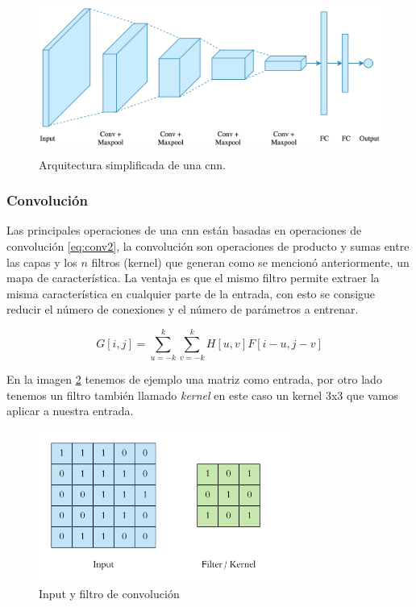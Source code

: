\begin{figure}[H]
 \centering
  \includegraphics[height=5cm,keepaspectratio=true,clip=true]{imagenes/MarcoTeorico/cnn_intuition.png}
  \caption{Arquitectura simplificada de una \ac{cnn}.} \label{Fig:cnn_network}
\end{figure}






\subsubsection{Convolución}\label{sub:convolucion}
Las principales operaciones de una \ac{cnn} están basadas en operaciones de convolución \ref{eq:conv2}, la convolución son operaciones de producto y sumas entre las capas y los $n $ filtros (kernel) que generan como se mencionó anteriormente, un mapa de característica. La ventaja es que el mismo filtro permite extraer la misma característica en cualquier parte de la entrada, con esto se consigue reducir el número de conexiones y el número de parámetros a entrenar.

\begin{equation}\label{eq:conv2}
    G[i, j] = \sum_{u=-k}^k \sum_{v=-k}^k H[u, v] F[i-u, j-v]
\end{equation} 





En la imagen \ref{Fig:filter} tenemos de ejemplo una matriz como entrada, por otro lado tenemos un filtro también llamado \textit{kernel} en este caso un kernel 3x3 que vamos aplicar a nuestra entrada.

\begin{figure}[H]
 \centering
  \includegraphics[height=5cm,keepaspectratio=true,clip=true]{imagenes/MarcoTeorico/convoluc_1.png}
  \caption{Input y filtro de convolución}\label{Fig:filter}
\end{figure}

